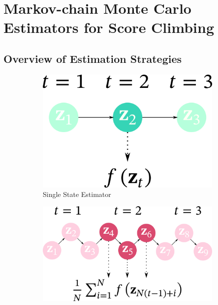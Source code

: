 
\section{Markov-chain Monte Carlo Estimators for Score Climbing}
\vspace{-0.05in}
\subsection{Overview of Estimation Strategies}\label{section:overview}
%
\begin{figure}
    \centering
    \begin{subfigure}[b]{0.25\textwidth}
        \centering
        \includegraphics[scale=0.25]{figures/diagram_1.png}
        \caption{Single State Estimator}\label{fig:single}
    \end{subfigure}
    \begin{subfigure}[b]{0.35\textwidth}
        \centering
        \includegraphics[scale=0.25]{figures/diagram_2.png}

\end{subfigure}
\end{figure}
